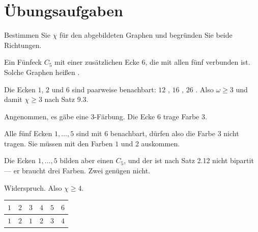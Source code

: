 \section{Übungsaufgaben}

\begin{aufgabe}
Bestimmen Sie $\chi$ für den abgebildeten Graphen und begründen Sie beide Richtungen.

\begin{center}
\end{center}

\loesung
{}
Ein Fünfeck $C_5$ mit einer zusätzlichen Ecke $6$, die mit allen fünf verbunden ist. Solche Graphen heißen .

Die Ecken $1$, $2$ und $6$ sind paarweise benachbart: $12$ \checkmark, $16$ \checkmark, $26$ \checkmark. Also $\omega \ge 3$ und damit $\chi \ge 3$ nach Satz 9.3.

Angenommen, es gäbe eine $3$-Färbung. Die Ecke $6$ trage Farbe $3$.

Alle fünf Ecken $1, \ldots, 5$ sind mit $6$ benachbart, dürfen also die Farbe $3$ nicht tragen. Sie müssen mit den Farben $1$ und $2$ auskommen.

Die Ecken $1, \ldots, 5$ bilden aber einen $C_5$, und der ist nach Satz 2.12 nicht bipartit --- er braucht drei Farben. Zwei genügen nicht.

Widerspruch. Also $\chi \ge 4$.

\begin{center}
\renewcommand{\arraystretch}{1.42}
\begin{tabular}{@{}P{1.2cm}P{1.2cm}P{1.2cm}P{1.2cm}P{1.2cm}P{1.2cm}@{}}
\toprule
$1$ & $2$ & $3$ & $4$ & $5$ & $6$\\
\midrule
$1$ & $2$ & $1$ & $2$ & $3$ & $4$\\
\bottomrule
\end{tabular}
\end{center}


\end{aufgabe}
